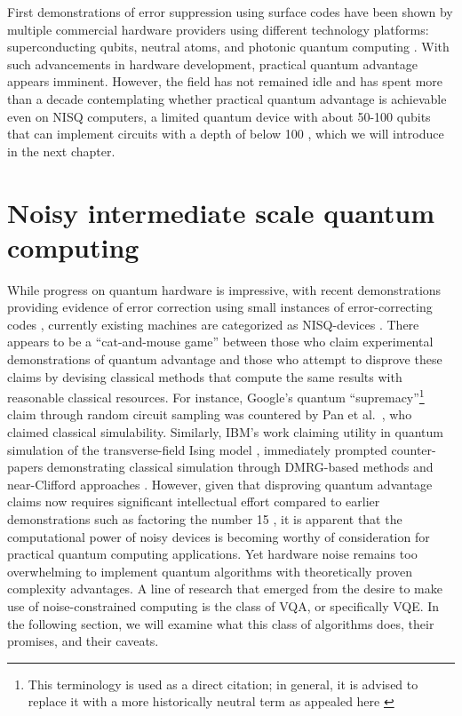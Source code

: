 \documentclass[../main.tex]{subfiles}
\begin{document}
First demonstrations of error suppression using surface codes have been shown by multiple commercial hardware providers using different technology platforms: superconducting qubits, neutral atoms, and photonic quantum computing  \cite{acharya2022suppressing, bluvstein2023logical, walshe2025linear}. With such advancements in hardware development, practical quantum advantage appears imminent. However, the field has not remained idle and has spent more than a decade contemplating whether practical quantum advantage is achievable even on \ac{NISQ} computers, a limited quantum device with about 50-100 qubits that can implement circuits with a depth of below 100 \cite{preskill2018quantum}, which we will introduce in the next chapter.


\section{Noisy intermediate scale quantum computing}

While progress on quantum hardware is impressive, with recent demonstrations providing evidence of error correction using small instances of error-correcting codes \cite{acharya2022suppressing, bluvstein2023logical, walshe2025linear}, currently existing machines are categorized as \ac{NISQ}-devices \cite{preskill2018quantum}. There appears to be a ``cat-and-mouse game'' between those who claim experimental demonstrations of quantum advantage and those who attempt to disprove these claims by devising classical methods that compute the same results with reasonable classical resources. For instance, Google's quantum ``supremacy''\footnote{This terminology is used as a direct citation; in general, it is advised to replace it with a more historically neutral term as appealed here \cite{palacios2019instead}} claim through random circuit sampling  \cite{arute2019quantum} was countered by Pan et al.~\cite{pan2022solving}, who claimed classical simulability.  Similarly, IBM's work claiming utility in quantum simulation of the transverse-field Ising model \cite{kim2023evidence}, immediately prompted counter-papers demonstrating classical simulation through DMRG-based methods \cite{tindall2024efficient} and near-Clifford approaches \cite{begusic2023fast}. However, given that disproving quantum advantage claims now requires significant intellectual effort compared to earlier demonstrations such as factoring the number 15 \cite{vandersypen2001experimental}, it is apparent that the computational power of noisy devices is becoming worthy of consideration for practical quantum computing applications. Yet hardware noise remains too overwhelming to implement quantum algorithms with theoretically proven complexity advantages. A line of research that emerged from the desire to make use of noise-constrained computing is the class of \ac{VQA}, or specifically \ac{VQE}. In the following section, we will examine what this class of algorithms does, their promises, and their caveats.
\end{document}
